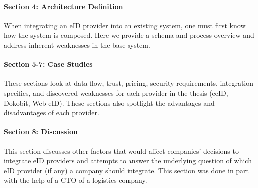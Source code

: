 \paragraph{Section 4: Architecture Definition} When integrating an eID provider into an existing system, one must first know how the system is composed. Here we provide a schema and process overview and address inherent weaknesses in the base system.
\paragraph{Section 5-7: Case Studies} These sections look at data flow, trust, pricing, security requirements, integration specifics, and discovered weaknesses for each provider in the thesis (eeID, Dokobit, Web eID). These sections also spotlight the advantages and disadvantages of each provider.
\paragraph{Section 8: Discussion} This section discusses other factors that would affect companies' decisions to integrate eID providers and attempts to answer the underlying question of which eID provider (if any) a company should integrate. This section was done in part with the help of a CTO of a logistics company.